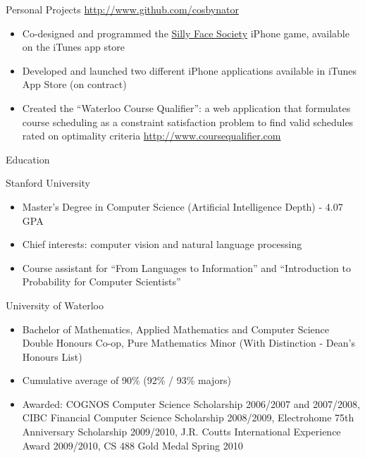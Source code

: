 \documentclass{article}
\newlength{\tabin}
\newlength{\secsep}
\newcommand{\lineunder}{\vspace*{-8pt} \\ \hspace*{-6pt} \hrulefill \\ \vspace*{-15pt}}
\newenvironment{tabbedsection}[1]{
  \begin{list}{}{
      \setlength{\itemsep}{0pt}
      \setlength{\labelsep}{0pt}
      \setlength{\labelwidth}{0pt}
      \setlength{\leftmargin}{\tabin}
      \setlength{\rightmargin}{\tabin}
      \setlength{\listparindent}{0pt}
      \setlength{\parsep}{0pt}
      \setlength{\parskip}{0pt}
      \setlength{\partopsep}{0pt}
      \setlength{\topsep}{#1}
    }
  \item[]
}{\end{list}}
\newenvironment{resume_section}[1]{
  \filbreak
  \vspace{2\secsep}
  \textsc{\large#1}
  \lineunder
  \begin{tabbedsection}{\secsep}
}{\end{tabbedsection}}
\newenvironment{resume_subsection}[2][]{
  \textbf{#2} \hfill {\footnotesize #1} \hspace{1.0em}
  \begin{tabbedsection}{0.5\secsep}
}{\end{tabbedsection}}
\newenvironment{subitems}{
  \renewcommand{\labelitemi}{-}
  \begin{itemize}
      \setlength{\labelsep}{1em}
}{\end{itemize}}
\begin{document}
\begin{resume_section}{Personal Projects {\footnotesize {\url{http://www.github.com/cosbynator}}}}
    \begin{subitems}
      \item Co-designed and programmed the \href{http://www.sillyfacesociety.com}{Silly Face Society} iPhone game, available on the iTunes app store
      \item Developed and launched two different iPhone applications available in iTunes App Store (on contract)
      \item Created the ``Waterloo Course Qualifier'': a web application that formulates course scheduling as a constraint satisfaction problem to find valid schedules rated on optimality criteria {\footnotesize \url{http://www.coursequalifier.com}}
    \end{subitems}
\end{resume_section}


\begin{resume_section}{Education}
  \begin{resume_subsection}{Stanford University}
    \begin{subitems}
      \item Master's Degree in Computer Science (Artificial Intelligence Depth) - 4.07 GPA
      \item Chief interests: computer vision and natural language processing 
      \item Course assistant for ``From Languages to Information'' and ``Introduction to Probability for Computer Scientists''
    \end{subitems}
  \end{resume_subsection}

  \begin{resume_subsection}[Waterloo, ON (2005--2010)]{University of Waterloo}
    \begin{subitems}
      \item Bachelor of Mathematics, Applied Mathematics and Computer Science Double Honours Co-op, Pure Mathematics Minor (With Distinction - Dean's Honours  List)
      \item Cumulative average of 90\% (92\% / 93\% majors) 
      \item Awarded: COGNOS Computer Science Scholarship 2006/2007 and 2007/2008, CIBC Financial Computer Science 
      Scholarship 2008/2009, Electrohome 75th Anniversary Scholarship 2009/2010, J.R. Coutts International Experience Award
      2009/2010, CS 488 Gold Medal Spring 2010
    \end{subitems}
  \end{resume_subsection}
\end{resume_section}
\end{document}
